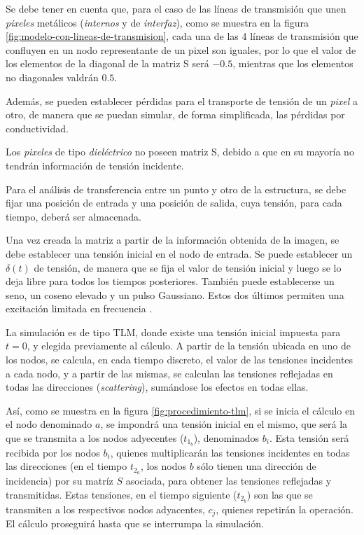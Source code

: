\begin{enumerate}
	Se debe tener en cuenta que, para el caso de las líneas de transmisión que unen \textit{pixeles} metálicos (\textit{internos} y de \textit{interfaz}), como se muestra en la figura \ref{fig:modelo-con-lineas-de-transmision}, cada una de las 4 líneas de transmisión que confluyen en un nodo representante de un pixel son iguales, por lo que el valor de los elementos de la diagonal de la matriz S será $-0.5$, mientras que los elementos no diagonales valdrán $0.5$.
	
	Además, se pueden establecer pérdidas para el transporte de tensión de un \textit{pixel} a otro, de manera que se puedan simular, de forma simplificada, las pérdidas por conductividad.
	
	Los \textit{pixeles} de tipo \textit{dieléctrico} no poseen matriz S, debido a que en su mayoría no tendrán información de tensión incidente.
\end{enumerate}


Para el análisis de transferencia entre un punto y otro de la estructura, se debe fijar una posición de entrada y una posición de salida, cuya tensión, para cada tiempo, deberá ser almacenada.

Una vez creada la matriz a partir de la información obtenida de la imagen, se debe establecer una tensión inicial en el nodo de entrada. Se puede establecer un $\delta(t)$ de tensión, de manera que se fija el valor de tensión inicial y luego se lo deja libre para todos los tiempos posteriores. También puede establecerse un seno, un coseno elevado y un pulso Gaussiano. Estos dos últimos permiten una excitación limitada en frecuencia \cite{Barthia:Handbook}.

La simulación es de tipo TLM, donde existe una tensión inicial impuesta para $t=0$, y elegida previamente al cálculo. A partir de la tensión ubicada en uno de los nodos, se calcula, en cada tiempo discreto, el valor de las tensiones incidentes a cada nodo, y a partir de las mismas, se calculan las tensiones reflejadas en todas las direcciones (\textit{scattering}), sumándose los efectos en todas ellas.

Así, como se muestra en la figura \ref{fig:procedimiento-tlm}, si se inicia el cálculo en el nodo denominado $a$, se impondrá una tensión inicial en el mismo, que será la que se transmita a los nodos adyecentes ($t_{1_b}$), denominados $b_i$. Esta tensión será recibida por los nodos $b_i$, quienes multiplicarán las tensiones incidentes en todas las direcciones (en el tiempo $t_{2_a}$, los nodos $b$ sólo tienen una dirección de incidencia) por su matríz $S$ asociada, para obtener las tensiones reflejadas y transmitidas. Estas tensiones, en el tiempo siguiente ($t_{2_b}$) son las que se transmiten a los respectivos nodos adyacentes, $c_j$, quienes repetirán la operación. El cálculo proseguirá hasta que se interrumpa la simulación.

